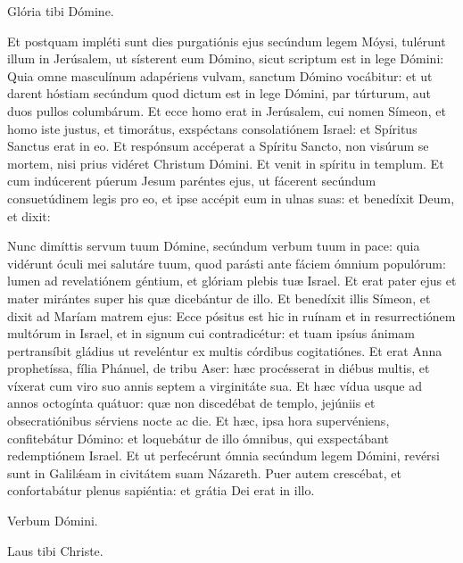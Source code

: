 \rubricatum{\Rbardot{}} Glória tibi Dómine.

Et postquam impléti sunt dies purgatiónis ejus secúndum legem Móysi, tulérunt illum in Jerúsalem, ut sísterent eum Dómino,
sicut scriptum est in lege Dómini: Quia omne masculínum adapériens vulvam, sanctum Dómino vocábitur:
et ut darent hóstiam secúndum quod dictum est in lege Dómini, par túrturum, aut duos pullos columbárum.
Et ecce homo erat in Jerúsalem, cui nomen Símeon, et homo iste justus, et timorátus, exspéctans consolatiónem Israel: et Spíritus Sanctus erat in eo.
Et respónsum accéperat a Spíritu Sancto, non visúrum se mortem, nisi prius vidéret Christum Dómini.
Et venit in spíritu in templum. Et cum indúcerent púerum Jesum paréntes ejus, ut fácerent secúndum consuetúdinem legis pro eo,
et ipse accépit eum in ulnas suas: et benedíxit Deum, et dixit:

Nunc dimíttis servum tuum Dómine, secúndum verbum tuum in pace:
quia vidérunt óculi mei salutáre tuum,
quod parásti ante fáciem ómnium populórum:
lumen ad revelatiónem géntium, et glóriam plebis tuæ Israel.
Et erat pater ejus et mater mirántes super his quæ dicebántur de illo.
Et benedíxit illis Símeon, et dixit ad Maríam matrem ejus: Ecce pósitus est hic in ruínam et in resurrectiónem multórum in Israel, et in signum cui contradicétur:
et tuam ipsíus ánimam pertransíbit gládius ut reveléntur ex multis córdibus cogitatiónes.
Et erat Anna prophetíssa, fília Phánuel, de tribu Aser: hæc procésserat in diébus multis, et víxerat cum viro suo annis septem a virginitáte sua.
Et hæc vídua usque ad annos octogínta quátuor: quæ non discedébat de templo, jejúniis et obsecratiónibus sérviens nocte ac die.
Et hæc, ipsa hora supervéniens, confitebátur Dómino: et loquebátur de illo ómnibus, qui exspectábant redemptiónem Israel.
Et ut perfecérunt ómnia secúndum legem Dómini, revérsi sunt in Galilǽam in civitátem suam Názareth.
Puer autem crescébat, et confortabátur plenus sapiéntia: et grátia Dei erat in illo.

Verbum Dómini.

\rubricatum{\Rbardot{}} Laus tibi Christe.
